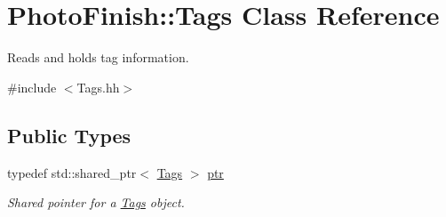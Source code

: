 \hypertarget{class_photo_finish_1_1_tags}{}\section{Photo\+Finish\+:\+:Tags Class Reference}
\label{class_photo_finish_1_1_tags}


Reads and holds tag information.  




{\ttfamily \#include $<$Tags.\+hh$>$}

\subsection*{Public Types}
\begin{DoxyCompactItemize}
\item 
typedef std\+::shared\+\_\+ptr$<$ \hyperlink{class_photo_finish_1_1_tags}{Tags} $>$ \hyperlink{class_photo_finish_1_1_tags_a3f9b01990d51bb4f4e5086182a8ddcf9}{ptr}
\begin{DoxyCompactList}\small\item\em Shared pointer for a \hyperlink{class_photo_finish_1_1_tags}{Tags} object. \end{DoxyCompactList}\end{DoxyCompactItemize}
